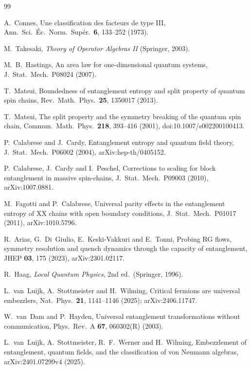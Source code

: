 \documentclass[10pt,a4paper]{article}
\theoremstyle{remark}
\begin{document}
\small
\setlength{\bibsep}{3pt plus 0.5pt minus 0.5pt}
\begin{thebibliography}{99}

 A.~Connes, Une classification des facteurs de type III,
Ann.\ Sci.\ \'Ec.\ Norm.\ Sup\'er.\ \textbf{6}, 133--252 (1973).

 M.~Takesaki, \emph{Theory of Operator Algebras II} (Springer, 2003).

 M.~B.~Hastings, An area law for one-dimensional quantum systems,
J.\ Stat.\ Mech.\ P08024 (2007).

 T.~Matsui, Boundedness of entanglement entropy and split property of quantum
spin chains, Rev.\ Math.\ Phys.\ \textbf{25}, 1350017 (2013).

 T.~Matsui, The split property and the symmetry breaking
of the quantum spin chain, Commun.\ Math.\ Phys.\ \textbf{218},
393--416 (2001), doi:10.1007/s002200100413.

 P.~Calabrese and J.~Cardy, Entanglement entropy and
quantum field theory, J.\ Stat.\ Mech.\ P06002 (2004), arXiv:hep-th/0405152.

 P.~Calabrese, J.~Cardy and I.~Peschel,
Corrections to scaling for block entanglement in massive spin-chains,
J.\ Stat.\ Mech.\ P09003 (2010), arXiv:1007.0881.

 M.~Fagotti and P.~Calabrese, Universal parity
effects in the entanglement entropy of XX chains with open boundary
conditions, J.\ Stat.\ Mech.\ P01017 (2011), arXiv:1010.5796.

 R.~Arias, G.~Di~Giulio, E.~Keski-Vakkuri and E.~Tonni,
Probing RG flows, symmetry resolution and quench dynamics through the
capacity of entanglement, JHEP \textbf{03}, 175 (2023), arXiv:2301.02117.

 R.~Haag, \emph{Local Quantum Physics}, 2nd ed.\ (Springer, 1996).

 L.~van~Luijk, A.~Stottmeister and H.~Wilming, Critical fermions are universal
embezzlers, Nat.\ Phys.\ \textbf{21}, 1141--1146 (2025); arXiv:2406.11747.

 W.~van~Dam and P.~Hayden, Universal entanglement transformations without
communication, Phys.\ Rev.\ A \textbf{67}, 060302(R) (2003).

 L.~van~Luijk, A.~Stottmeister, R.~F.~Werner and H.~Wilming, Embezzlement of
entanglement, quantum fields, and the classification of von Neumann algebras,
arXiv:2401.07299v4 (2025).


\end{thebibliography}
\end{document}
